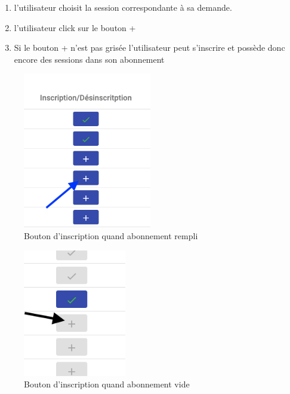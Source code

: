 \begin{enumerate}
	\item l'utilisateur choisit la session correspondante à sa demande.
	\item l'utilisateur click sur le bouton +
	\item Si le bouton + n'est pas grisée l'utilisateur peut s'inscrire et possède donc encore des sessions dans son abonnement
\end{enumerate}

\vspace{\baselineskip}
\begin{figure}[h]
	\includegraphics[width=0.5\textwidth,center]{Figures/us3-1}
	\caption{Bouton d'inscription quand abonnement rempli}
\end{figure}

\newpage
\begin{figure}[h]
	\includegraphics[width=0.4\textwidth,center]{Figures/us9-1}
	\caption{Bouton d'inscription quand abonnement vide}
\end{figure}
